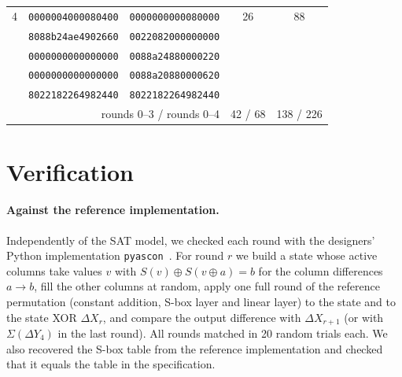 \documentclass[11pt,a4paper]{article}
\begin{document}
\begin{table}[h]
\begin{tabular}{c l l c c}
\midrule
4 & \texttt{0000004000080400} & \texttt{0000000000080000} & 26 & 88 \\
  & \texttt{8088b24ae4902660} & \texttt{0022082000000000} & & \\
  & \texttt{0000000000000000} & \texttt{0088a24880000220} & & \\
  & \texttt{0000000000000000} & \texttt{0088a20880000620} & & \\
  & \texttt{8022182264982440} & \texttt{8022182264982440} & & \\
\midrule
\multicolumn{3}{r}{rounds 0--3 / rounds 0--4} & 42 / 68 & 138 / 226 \\
\bottomrule
\end{tabular}
\end{table}

\section{Verification}

\paragraph{Against the reference implementation.} Independently of the SAT model, we checked each
round with the designers' Python implementation \texttt{pyascon}~\cite{pyascon}. For round $r$ we
build a state whose active columns take values $v$ with $S(v)\oplus S(v\oplus a)=b$ for the
column differences $a\to b$, fill the other columns at random, apply one full round of the
reference permutation (constant addition, S-box layer and linear layer) to the state and to the
state XOR $\Delta X_r$, and compare the output difference with $\Delta X_{r+1}$ (or with
$\Sigma(\Delta Y_4)$ in the last round). All rounds matched in 20 random trials each. We also
recovered the S-box table from the reference implementation and checked that it equals the table
in the specification.
\end{document}
